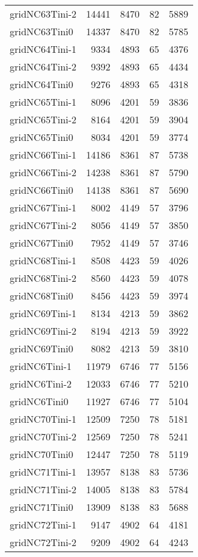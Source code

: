 \begin{longtable}{lrrrr}
gridNC63Tini-2 & 14441 & 8470 & 82 & 5889 \\
gridNC63Tini0 & 14337 & 8470 & 82 & 5785 \\
gridNC64Tini-1 & 9334 & 4893 & 65 & 4376 \\
gridNC64Tini-2 & 9392 & 4893 & 65 & 4434 \\
gridNC64Tini0 & 9276 & 4893 & 65 & 4318 \\
gridNC65Tini-1 & 8096 & 4201 & 59 & 3836 \\
gridNC65Tini-2 & 8164 & 4201 & 59 & 3904 \\
gridNC65Tini0 & 8034 & 4201 & 59 & 3774 \\
gridNC66Tini-1 & 14186 & 8361 & 87 & 5738 \\
gridNC66Tini-2 & 14238 & 8361 & 87 & 5790 \\
gridNC66Tini0 & 14138 & 8361 & 87 & 5690 \\
gridNC67Tini-1 & 8002 & 4149 & 57 & 3796 \\
gridNC67Tini-2 & 8056 & 4149 & 57 & 3850 \\
gridNC67Tini0 & 7952 & 4149 & 57 & 3746 \\
gridNC68Tini-1 & 8508 & 4423 & 59 & 4026 \\
gridNC68Tini-2 & 8560 & 4423 & 59 & 4078 \\
gridNC68Tini0 & 8456 & 4423 & 59 & 3974 \\
gridNC69Tini-1 & 8134 & 4213 & 59 & 3862 \\
gridNC69Tini-2 & 8194 & 4213 & 59 & 3922 \\
gridNC69Tini0 & 8082 & 4213 & 59 & 3810 \\
gridNC6Tini-1 & 11979 & 6746 & 77 & 5156 \\
gridNC6Tini-2 & 12033 & 6746 & 77 & 5210 \\
gridNC6Tini0 & 11927 & 6746 & 77 & 5104 \\
gridNC70Tini-1 & 12509 & 7250 & 78 & 5181 \\
gridNC70Tini-2 & 12569 & 7250 & 78 & 5241 \\
gridNC70Tini0 & 12447 & 7250 & 78 & 5119 \\
gridNC71Tini-1 & 13957 & 8138 & 83 & 5736 \\
gridNC71Tini-2 & 14005 & 8138 & 83 & 5784 \\
gridNC71Tini0 & 13909 & 8138 & 83 & 5688 \\
gridNC72Tini-1 & 9147 & 4902 & 64 & 4181 \\
gridNC72Tini-2 & 9209 & 4902 & 64 & 4243 \\

\end{longtable}
